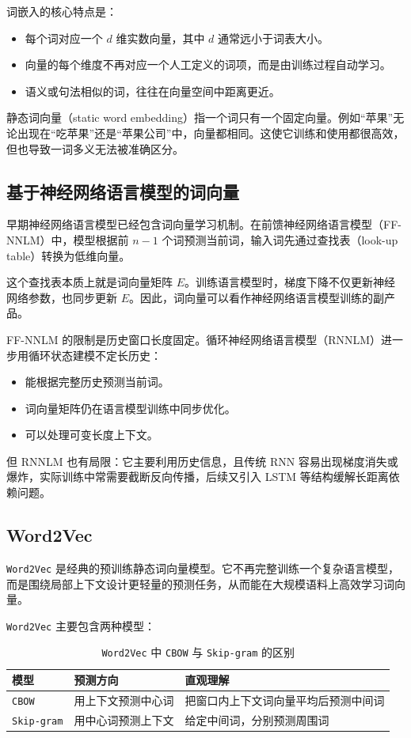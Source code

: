 词嵌入的核心特点是：
\begin{itemize}
  \item 每个词对应一个 $d$ 维实数向量，其中 $d$ 通常远小于词表大小。
  \item 向量的每个维度不再对应一个人工定义的词项，而是由训练过程自动学习。
  \item 语义或句法相似的词，往往在向量空间中距离更近。
\end{itemize}

静态词向量（static word embedding）指一个词只有一个固定向量。例如“苹果”无论出现在“吃苹果”还是“苹果公司”中，向量都相同。这使它训练和使用都很高效，但也导致一词多义无法被准确区分。

\subsection{基于神经网络语言模型的词向量}

早期神经网络语言模型已经包含词向量学习机制。在前馈神经网络语言模型（FF-NNLM）中，模型根据前 $n-1$ 个词预测当前词，输入词先通过查找表（look-up table）转换为低维向量。

这个查找表本质上就是词向量矩阵 $E$。训练语言模型时，梯度下降不仅更新神经网络参数，也同步更新 $E$。因此，词向量可以看作神经网络语言模型训练的副产品。

FF-NNLM 的限制是历史窗口长度固定。循环神经网络语言模型（RNNLM）进一步用循环状态建模不定长历史：
\begin{itemize}
  \item 能根据完整历史预测当前词。
  \item 词向量矩阵仍在语言模型训练中同步优化。
  \item 可以处理可变长度上下文。
\end{itemize}

但 RNNLM 也有局限：它主要利用历史信息，且传统 RNN 容易出现梯度消失或爆炸，实际训练中常需要截断反向传播，后续又引入 LSTM 等结构缓解长距离依赖问题。

\subsection{Word2Vec}

\texttt{Word2Vec} 是经典的预训练静态词向量模型。它不再完整训练一个复杂语言模型，而是围绕局部上下文设计更轻量的预测任务，从而能在大规模语料上高效学习词向量。

\texttt{Word2Vec} 主要包含两种模型：

\begin{table}[H]
\centering
\small
\begin{tabular}{|p{}|p{}|p{}|}
\hline
模型 & 预测方向 & 直观理解 \\ \hline
\texttt{CBOW} & 用上下文预测中心词 & 把窗口内上下文词向量平均后预测中间词 \\ \hline
\texttt{Skip-gram} & 用中心词预测上下文 & 给定中间词，分别预测周围词 \\ \hline
\end{tabular}
\caption{\texttt{Word2Vec} 中 \texttt{CBOW} 与 \texttt{Skip-gram} 的区别}
\end{table}

